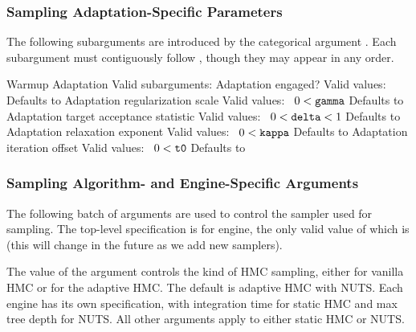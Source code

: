 \subsubsection{Sampling Adaptation-Specific Parameters}

The following subarguments are introduced by the categorical argument
.  Each subargument must contiguously follow ,
though they may appear in any order.  

\begin{description}
      {Warmup Adaptation}
      {Valid subarguments: }
%
        {Adaptation engaged?}
        {Valid values: \ }
        {Defaults to }
%
        {Adaptation regularization scale}
        {Valid values: \  $0 < \mbox{{\tt gamma}}$}
        {Defaults to }
%
        {Adaptation target acceptance statistic}
        {Valid values: \  $0 < \mbox{{\tt delta}} < 1$}
        {Defaults to }
%
        {Adaptation relaxation exponent}
        {Valid values: \  $0 < \mbox{\tt kappa}$}
        {Defaults to }
%
        {Adaptation iteration offset}
        {Valid values: \  $0 < \mbox{{\tt t0}}$}
        {Defaults to }
%
\end{description}

\subsubsection{Sampling Algorithm- and Engine-Specific Arguments}

The following batch of arguments are used to control the sampler used
for sampling.  The top-level specification is for engine, the only
valid value of which is  (this will change in the future as
we add new samplers).  

The value of the argument  controls the kind of HMC
sampling, either  for vanilla HMC or  for the
adaptive HMC.  The default is adaptive HMC with NUTS.  Each engine has
its own specification, with integration time for static HMC and max
tree depth for NUTS.  All other arguments apply to either static HMC
or NUTS.


